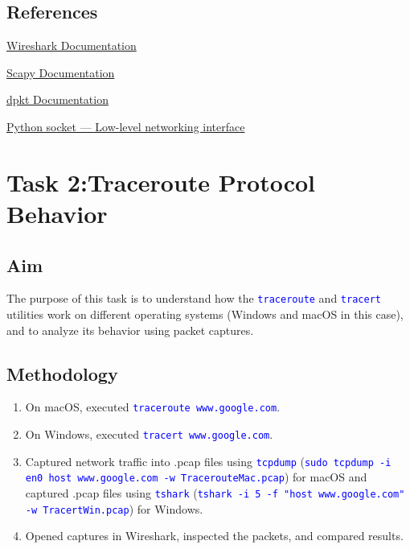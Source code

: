 \documentclass[10pt,a4paper]{report}
\newcommand{\command}[1]{\texttt{\textcolor{blue}{#1}}}
\begin{document}
\section{References}
\begin{enumerate}[label={[\arabic*]}, itemsep=0.05em, topsep=0pt]
    \item \href{https://www.wireshark.org/docs/}{Wireshark Documentation}
    \item \href{https://scapy.readthedocs.io/en/latest/}{Scapy Documentation}
    \item \href{https://dpkt.readthedocs.io/en/latest/}{dpkt Documentation}
    \item \href{https://docs.python.org/3/library/socket.html}{Python socket — Low-level networking interface}
\end{enumerate}





\chapter{Task 2:Traceroute Protocol Behavior}
\section{Aim}
The purpose of this task is to understand how the \command{traceroute} and \command{tracert} utilities work on different operating systems (Windows and macOS in this case), and to analyze its behavior using packet captures.

\section{Methodology}
\begin{enumerate}
    \item On macOS, executed \command{traceroute www.google.com}.
    \item On Windows, executed \command{tracert www.google.com}.
    \item Captured network traffic into .pcap files using \command{tcpdump} (\command{sudo tcpdump -i en0 host www.google.com -w TracerouteMac.pcap}) for macOS 
    and captured .pcap files using \command{tshark} (\command{tshark -i 5 -f "host www.google.com" -w TracertWin.pcap}) for Windows.
    \item Opened captures in Wireshark, inspected the packets, and compared results.
\end{enumerate}
\end{document}
